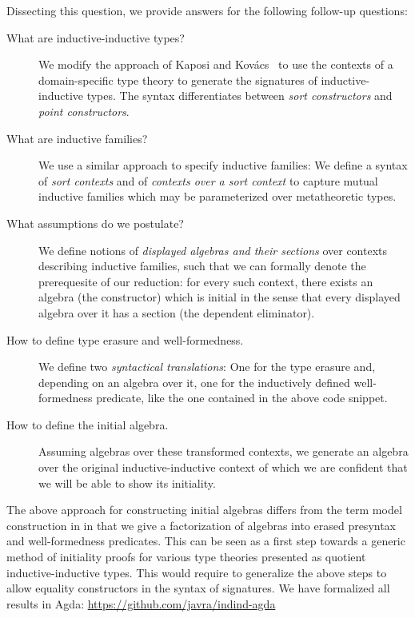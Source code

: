 \documentclass{easychair}
\begin{document}
\newpage

\noindent Dissecting this question, we provide answers for the following follow-up questions:

\begin{description}
\item[What are inductive-inductive types?]
We modify the approach of Kaposi and Kovács~\cite{qiit}
to use the contexts of a domain-specific type theory to generate the signatures
of inductive-inductive types. The syntax differentiates between \emph{sort
constructors} and \emph{point constructors}.
\item[What are inductive families?]
We use a similar approach to specify inductive families:
We define a syntax of \emph{sort contexts} and of \emph{contexts over a sort context}
to capture mutual inductive families which may be parameterized over metatheoretic
types.
\item[What assumptions do we postulate?]
We define notions of \emph{displayed algebras and their sections} over contexts
describing inductive families, such that we can formally denote the prerequesite
of our reduction:
for every such context, there exists an algebra (the constructor) which is initial
in the sense that every displayed algebra over it has a section (the dependent eliminator).
\item[How to define type erasure and well-formedness.]
We define two \emph{syntactical translations}: One for the type erasure and,
depending on an algebra over it, one for the inductively defined well-formedness
predicate, like the one contained in the above code snippet.
\item[How to define the initial algebra.]
Assuming algebras over these transformed contexts, we generate an algebra over
the original inductive-inductive context of which we are confident that we will
be able to show its initiality.
\end{description}

\noindent
The above approach for constructing initial algebras differs from the term model
construction in \cite{qiit} in that we give a factorization of algebras
into erased presyntax and well-formedness predicates. This can be seen as a
first step towards a generic method of initiality proofs for various type
theories presented as quotient inductive-inductive types. This would require to
generalize the above steps to allow equality constructors in the syntax of
signatures. We have formalized all results in Agda:
\url{https://github.com/javra/indind-agda}




\end{document}

